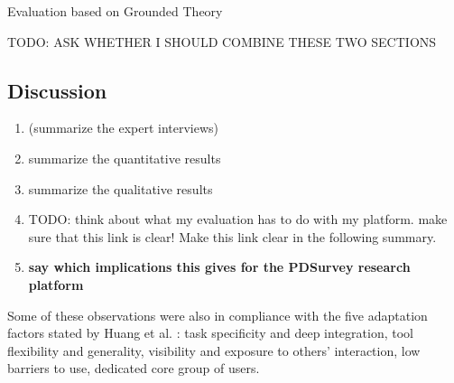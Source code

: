 





	Evaluation based on Grounded Theory




	TODO: ASK WHETHER I SHOULD COMBINE THESE TWO SECTIONS






\subsection{Discussion}


	\begin{enumerate}
	\item (summarize the expert interviews)
	\item summarize the quantitative results
	\item summarize the qualitative results 
	\item TODO: think about what my evaluation has to do with my platform. make sure that this link is clear! Make this link clear in the following summary.
	\item \textbf{say which implications this gives for the PDSurvey research platform}
	\end{enumerate}


	Some of these observations were also in compliance with the five adaptation factors stated by Huang et al. \cite{Huang2004}: task specificity and deep integration, tool flexibility and generality, visibility and exposure to others' interaction, low barriers to use, dedicated core group of users.

